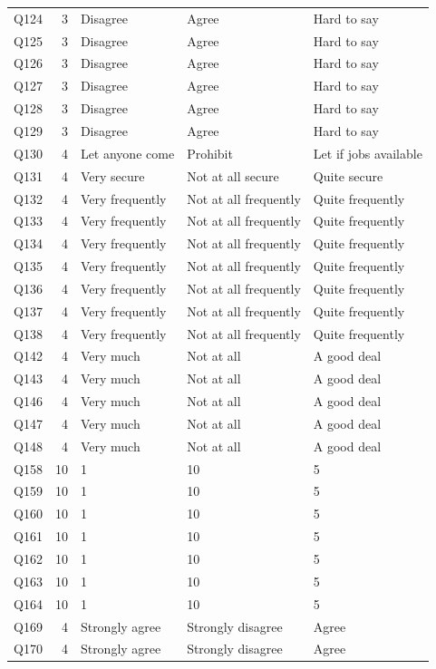\begin{longtable}{l r l l l}
Q124 & 3 & Disagree & Agree & Hard to say \\
Q125 & 3 & Disagree & Agree & Hard to say \\
Q126 & 3 & Disagree & Agree & Hard to say \\
Q127 & 3 & Disagree & Agree & Hard to say \\
Q128 & 3 & Disagree & Agree & Hard to say \\
Q129 & 3 & Disagree & Agree & Hard to say \\
Q130 & 4 & Let anyone come & Prohibit & Let if jobs available \\
Q131 & 4 & Very secure & Not at all secure & Quite secure \\
Q132 & 4 & Very frequently & Not at all frequently & Quite frequently \\
Q133 & 4 & Very frequently & Not at all frequently & Quite frequently \\
Q134 & 4 & Very frequently & Not at all frequently & Quite frequently \\
Q135 & 4 & Very frequently & Not at all frequently & Quite frequently \\
Q136 & 4 & Very frequently & Not at all frequently & Quite frequently \\
Q137 & 4 & Very frequently & Not at all frequently & Quite frequently \\
Q138 & 4 & Very frequently & Not at all frequently & Quite frequently \\
Q142 & 4 & Very much & Not at all & A good deal \\
Q143 & 4 & Very much & Not at all & A good deal \\
Q146 & 4 & Very much & Not at all & A good deal \\
Q147 & 4 & Very much & Not at all & A good deal \\
Q148 & 4 & Very much & Not at all & A good deal \\
Q158 & 10 & 1 & 10 & 5 \\
Q159 & 10 & 1 & 10 & 5 \\
Q160 & 10 & 1 & 10 & 5 \\
Q161 & 10 & 1 & 10 & 5 \\
Q162 & 10 & 1 & 10 & 5 \\
Q163 & 10 & 1 & 10 & 5 \\
Q164 & 10 & 1 & 10 & 5 \\
Q169 & 4 & Strongly agree & Strongly disagree & Agree \\
Q170 & 4 & Strongly agree & Strongly disagree & Agree \\

\end{longtable}
